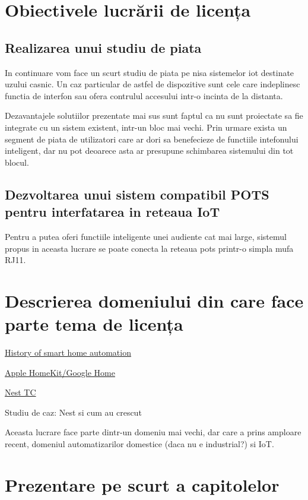 \section {Obiectivele lucrării de licența}

\subsection {Realizarea unui studiu de piata}

In continuare vom face un scurt studiu de piata pe nisa sistemelor \acrfull{iot} destinate uzului casnic. Un caz particular de astfel de dispozitive sunt cele care indeplinesc functia de interfon sau ofera contrulul accesului intr-o incinta de la distanta.

Dezavantajele solutiilor prezentate mai sus sunt faptul ca nu sunt proiectate sa fie integrate cu un sistem existent, intr-un bloc mai vechi. Prin urmare exista un segment de piata de utilizatori care ar dori sa benefecieze de functiile intefonului inteligent, dar nu pot deoarece asta ar presupune schimbarea sistemului din tot blocul.

\subsection {Dezvoltarea unui sistem compatibil POTS pentru interfatarea in reteaua IoT}

Pentru a putea oferi functiile inteligente unei audiente cat mai large, sistemul propus in aceasta lucrare se poate conecta la reteaua \acrfull{pots} printr-o simpla mufa RJ11.

\section {Descrierea domeniului din care face parte tema de licența}

\href{https://zeusintegrated.com/blog/item/a-brief-history-of-smart-home-automation}{History of smart home automation}

\href{https://www.familyhandyman.com/article/the-history-of-smart-home-technology/}{Apple HomeKit/Google Home}

\href{https://techcrunch.com/2013/05/11/from-the-garage-to-200-employees-in-3-years-how-nest-thermostats-were-born/}{Nest TC}

Studiu de caz: Nest si cum au crescut


Aceasta lucrare face parte dintr-un domeniu mai vechi, dar care a prins amploare recent, domeniul automatizarilor domestice (daca nu e industrial?) si IoT. 

\section {Prezentare pe scurt a capitolelor}

